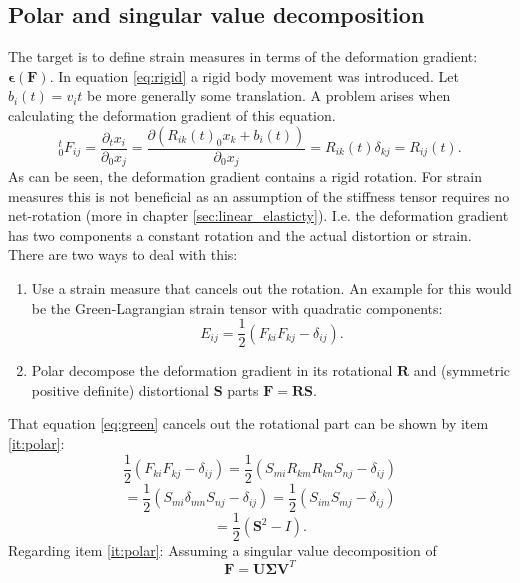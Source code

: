 \documentclass[m,times]{cgMA}
\begin{document}
\subsection{Polar and singular value decomposition}\label{sec:svd}
The target is to define strain measures in terms of the deformation gradient: $\boldsymbol{\epsilon}(\boldsymbol{F})$. In equation \ref{eq:rigid} a rigid body movement was introduced. Let $b_i(t) = v_it$ be more generally some translation. A problem arises when calculating the deformation gradient of this equation.
\begin{equation}
  ^t_0F_{ij} = \frac{\partial{_tx_i}}{\partial_0x_j} = \frac{\partial (R_{ik}(t)_0x_k+b_i(t))}{\partial _0x_j} = R_{ik}(t) \delta_{kj} = R_{ij}(t).
\end{equation}
As can be seen, the deformation gradient contains a rigid rotation. For strain measures this is not beneficial as an assumption of the stiffness tensor requires no net-rotation (more in chapter \ref{sec:linear_elasticty}). I.e. the deformation gradient has two components a constant rotation and the actual distortion or strain. There are two ways to deal with this:
\begin{enumerate}
  \item  Use a strain measure that cancels out the rotation. An example for this would be the Green-Lagrangian strain tensor with quadratic components:
    \begin{equation}\label{eq:green}
      E _ { i j } = \frac { 1 } { 2 } \left( F _ { k i } F _ { k j } - \delta _ { i j } \right).
    \end{equation}
  \item \label{it:polar} Polar decompose the deformation gradient in its rotational $\boldsymbol{R}$ and (symmetric positive definite) distortional $\boldsymbol{S}$ parts $\boldsymbol{F}=\boldsymbol{R}\boldsymbol{S}$.
\end{enumerate}
That equation \ref{eq:green} cancels out the rotational part can be shown by item \ref{it:polar}:
$$ \frac { 1 } { 2 } \left( F _ { k i } F _ { k j } - \delta _ { i j } \right) = \frac { 1 } { 2 } \left( S _ {m i}R_{k m} R _ { k n} S_{n j} - \delta _ { i j } \right)$$
$$= \frac { 1 } { 2 } \left( S _ {m i} \delta_{mn} S_{n j} - \delta _ { i j } \right) = \frac { 1 } { 2 } \left( S _ {i m} S_{m j} - \delta _ { i j } \right)$$
$$= \frac{1}{2} \left(\boldsymbol{S}^2 - I \right).$$
Regarding item \ref{it:polar}: Assuming a singular value decomposition of
\begin{equation}\label{eq:svd}
  \boldsymbol{F} = \boldsymbol{U\Sigma V}^T
\end{equation}
\end{document}
